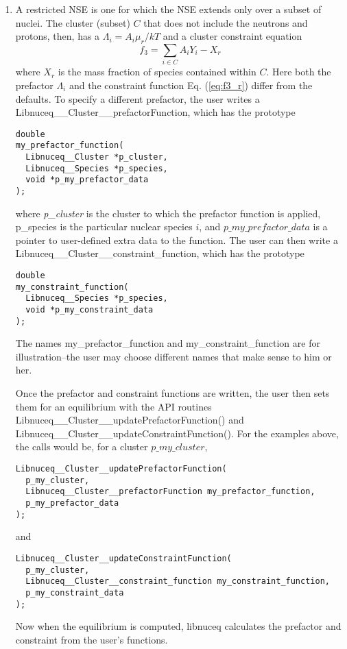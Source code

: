 \documentclass{article}    %
\begin{document}
\begin{enumerate}
\item\label{sec:rnse}
A restricted NSE is one for which the NSE extends only over a subset of nuclei.
The cluster (subset) $C$
that does not include the neutrons and protons, then, has
a $\Lambda_i = A_i \mu_r / kT$ and a cluster constraint equation
\begin{equation}
f_3 = \sum_{i\in C} A_i Y_i - X_r
\label{eq:f3_r}
\end{equation}
where $X_r$ is the mass fraction of species contained within $C$.
Here both the prefactor $\Lambda_i$ and the constraint function
Eq. (\ref{eq:f3_r}) differ from the defaults.  To specify a different
prefactor, the user writes a Libnuceq\_\_Cluster\_\_prefactorFunction,
which has the prototype
\begin{verbatim}
double
my_prefactor_function(
  Libnuceq__Cluster *p_cluster,
  Libnuceq__Species *p_species,
  void *p_my_prefactor_data
);
\end{verbatim}
where {\em p\_cluster} is the cluster to which the prefactor function is
applied, {p\_species} is the particular nuclear species $i$, and
$p\_my\_prefactor\_data$
is a pointer to user-defined extra data to the function.  The user can
then write a Libnuceq\_\_Cluster\_\_constraint\_function,
which has the prototype
\begin{verbatim}
double
my_constraint_function(
  Libnuceq__Species *p_species,
  void *p_my_constraint_data
);
\end{verbatim}
The names my\_prefactor\_function and my\_constraint\_function
are for illustration--the user may choose different names that make
sense to him or her.

Once the prefactor and constraint functions are written, the user then
sets them for an equilibrium with the API routines
Libnuceq\_\_Cluster\_\_updatePrefactorFunction()
and
Libnuceq\_\_Cluster\_\_updateConstraintFunction().  For the examples above,
the calls would be, for a cluster $p\_my\_cluster$,
\begin{verbatim}
Libnuceq__Cluster__updatePrefactorFunction(
  p_my_cluster,
  Libnuceq__Cluster__prefactorFunction my_prefactor_function,
  p_my_prefactor_data
);
\end{verbatim}
and
\begin{verbatim}
Libnuceq__Cluster__updateConstraintFunction(
  p_my_cluster,
  Libnuceq__Cluster__constraint_function my_constraint_function,
  p_my_constraint_data
);
\end{verbatim}
Now when the equilibrium is computed, libnuceq calculates the prefactor
and constraint from the user's functions.

\end{enumerate}
\end{document}
